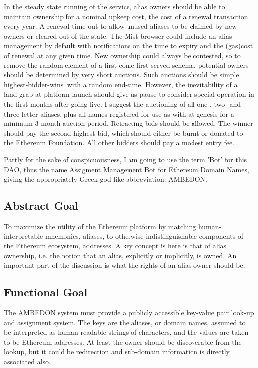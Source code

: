 \documentclass[10pt,a4paper]{article}
\begin{document}
In the steady state running of the service, alias owners should be able to maintain ownership for a nominal upkeep cost, \eg the cost of a renewal transaction every year. A renewal time-out to allow unused aliases to be claimed by new owners or cleared out of the state. The Mist browser could include an alias management \dapp by default with notifications on the time to expiry and the (gas)cost of renewal at any given time. New ownership could always be contested, so to remove the random element of a first-come-first-served schema, potential owners should be determined by very short auctions. Such auctions should be simple highest-bidder-wins, with a random end-time. However, the inevitability of a land-grab at platform launch should give us pause to consider special operation in the first months after going live. I suggest the auctioning of all one-, two- and three-letter aliases, plus all names registered for use as \tlds with \icann at genesis for a minimum 3 month auction period. Retracting bids should be allowed. The winner should pay the second highest bid, which should either be burnt or donated to the Ethereum Foundation. All other bidders should pay a modest entry fee.

Partly for the sake of conspicuousness, I am going to use the term 'Bot' for this DAO, thus the name Assigment Management Bot for Ethereum Domain Names, giving the appropriately Greek god-like abbreviation: AMBEDON.


\subsection*{Abstract Goal}
To maximize the utility of the Ethereum platform by matching human-interpretable mnemonics, aliases, to otherwise indistinguishable components of the Ethereum ecosystem, addresses. A key concept is here is that of alias ownership, i.e. the notion that an alias, explicitly or implicitly, is owned. An important part of the discussion is what the rights of an alias owner should be.

\subsection*{Functional Goal}
The AMBEDON system must provide a publicly accessible key-value pair look-up and assignment system. The keys are the aliases, or domain names, assumed to be interpreted as human-readable strings of characters, and the values are taken to be Ethereum addresses. At least the owner should be discoverable from the lookup, but it could be redirection and sub-domain information is directly associated also.
\end{document}
